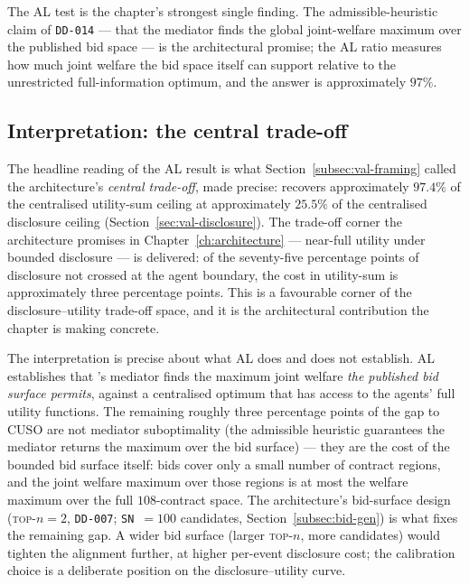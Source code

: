 The AL test is the chapter's strongest single finding. The
admissible-heuristic claim of \texttt{DD-014} --- that the mediator
finds the global joint-welfare maximum over the published bid space
--- is the architectural promise; the AL ratio measures how much
joint welfare the bid space itself can support relative to the
unrestricted full-information optimum, and the answer is
approximately $97\%$.

\subsection*{Interpretation: the central trade-off}

The headline reading of the AL result is what
Section~\ref{subsec:val-framing} called the architecture's
\emph{central trade-off}, made precise: \NEXUS{} recovers
approximately $97.4\%$ of the centralised utility-sum ceiling at
approximately $25.5\%$ of the centralised disclosure ceiling
(Section~\ref{sec:val-disclosure}). The trade-off corner the
architecture promises in Chapter~\ref{ch:architecture} --- near-full
utility under bounded disclosure --- is delivered: of the
seventy-five percentage points of disclosure not crossed at the
agent boundary, the cost in utility-sum is approximately three
percentage points. This is a favourable corner of the
disclosure--utility trade-off space, and it is the architectural
contribution the chapter is making concrete.

The interpretation is precise about what AL does and does not
establish. AL establishes that \NEXUS{}'s mediator finds the maximum
joint welfare \emph{the published bid surface permits}, against a
centralised optimum that has access to the agents' full utility
functions. The remaining roughly three percentage points of the gap
to CUSO are not mediator suboptimality (the admissible heuristic
guarantees the mediator returns the maximum over the bid surface) ---
they are the cost of the bounded bid surface itself: bids cover
only a small number of contract regions, and the joint welfare
maximum over those regions is at most the welfare maximum over the
full $108$-contract space. The architecture's bid-surface design
(\textsc{top-}$n = 2$, \texttt{DD-007}; \texttt{SN}~$=100$
candidates, Section~\ref{subsec:bid-gen}) is what fixes the
remaining gap. A wider bid surface (larger \textsc{top-}$n$, more
candidates) would tighten the alignment further, at higher per-event
disclosure cost; the calibration choice is a deliberate position on
the disclosure--utility curve.

